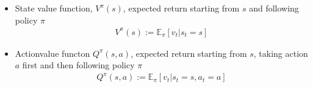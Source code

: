 \documentclass[letterpaper,10pt,english]{jupyterBook}
\begin{document}
\sphinxAtStartPar
{}
\begin{itemize}
\item {} 
\sphinxAtStartPar
State value function, \(V^{\pi}(s)\), expected return starting from \(s\) and following policy \(\pi\)
\begin{equation*}
\begin{split}V^{\pi}(s) := \mathbb{E}_{\pi} \left[ v_t | s_t = s \right]\end{split}
\end{equation*}
\item {} 
\sphinxAtStartPar
Action\sphinxhyphen{}value functon \(Q^{\pi}(s,a)\), expected return starting from \(s\), taking action \(a\) first and then following policy \(\pi\)
\begin{equation*}
\begin{split}Q^{\pi}(s,a) := \mathbb{E}_{\pi} \left[ v_t | s_t = s, a_t = a \right]\end{split}
\end{equation*}
\end{itemize}
\end{document}
